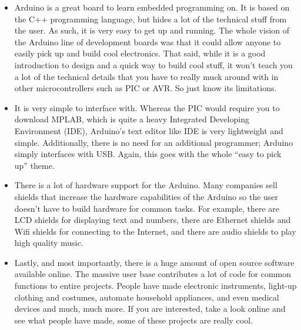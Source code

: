 \documentclass[10pt]{report}
\begin{document}
\begin{itemize}
\item
Arduino is a great board to learn embedded programming on. It is based on the C++ programming language, but hides a lot of the technical stuff from the user. As such, it is very easy to get up and running. The whole vision of the Arduino line of development boards was that it could allow anyone to easily pick up and build cool electronics. That said, while it is a good introduction to design and a quick way to build cool stuff, it won’t teach you a lot of the technical details that you have to really muck around with in other microcontrollers such as PIC or AVR. So just know its limitations.
\item
It is very simple to interface with. Whereas the PIC would require you to download MPLAB, which is quite a heavy Integrated Developing Environment (IDE), Arduino’s text editor like IDE is very lightweight and simple. Additionally, there is no need for an additional programmer; Arduino simply interfaces with USB. Again, this goes with the whole “easy to pick up” theme.
\item
There is a lot of hardware support for the Arduino. Many companies sell shields that increase the hardware capabilities of the Arduino so the user doesn’t have to build hardware for common tasks. For example, there are LCD shields for displaying text and numbers, there are Ethernet shields and Wifi shields for connecting to the Internet, and there are audio shields to play high quality music.
\item
Lastly, and most importantly, there is a huge amount of open source software available online. The massive user base contributes a lot of code for common functions to entire projects. People have made electronic instruments, light-up clothing and costumes, automate household appliances, and even medical devices and much, much more. If you are interested, take a look online and see what people have made, some of these projects are really cool.

\end{itemize}
\end{document}
